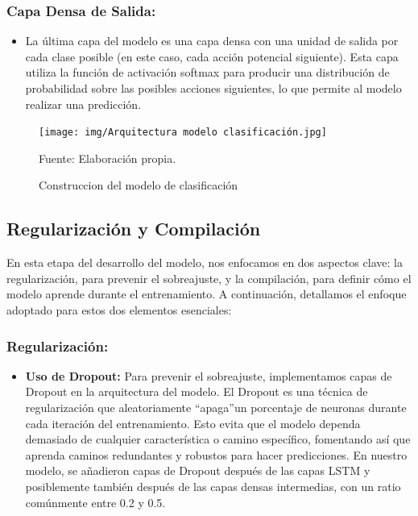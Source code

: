 \subsubsection{Capa Densa de Salida:} 
\begin{itemize}
    \item La última capa del modelo es una capa densa con una unidad de salida por cada clase posible (en este caso, cada acción potencial siguiente). Esta capa utiliza la función de activación softmax para producir una distribución de probabilidad sobre las posibles acciones siguientes, lo que permite al modelo realizar una predicción.
\end{itemize}

\begin{figure}[H]
    \begin{minipage}[t]{0.9\textwidth}
        \caption{Construccion del modelo de clasificación}
        \label{parquitectura_clasificación}        
    \end{minipage}

    \vspace{10pt}

    \begin{minipage}[b]{1\textwidth}
        \centering
        \texttt{[image: img/Arquitectura modelo clasificación.jpg]}        
    \end{minipage}

    \begin{minipage}[t]{0.9\textwidth}
        Fuente: Elaboración propia.
    \end{minipage}
\end{figure}

\subsection{Regularización y Compilación}

En esta etapa del desarrollo del modelo, nos enfocamos en dos aspectos clave: la regularización, para prevenir el sobreajuste, y la compilación, para definir cómo el modelo aprende durante el entrenamiento. A continuación, detallamos el enfoque adoptado para estos dos elementos esenciales:

\subsubsection{Regularización:} 
\begin{itemize}
    \item \textbf{Uso de Dropout:} Para prevenir el sobreajuste, implementamos capas de Dropout en la arquitectura del modelo. El Dropout es una técnica de regularización que aleatoriamente \textquotedblleft apaga\textquotedblright un porcentaje de neuronas durante cada iteración del entrenamiento. Esto evita que el modelo dependa demasiado de cualquier característica o camino específico, fomentando así que aprenda caminos redundantes y robustos para hacer predicciones. En nuestro modelo, se añadieron capas de Dropout después de las capas LSTM y posiblemente también después de las capas densas intermedias, con un ratio comúnmente entre 0.2 y 0.5.
\end{itemize}


